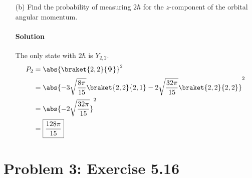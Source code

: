 \documentclass{article}
\begin{document}
\begin{enumerate}
		\item[(b)] Find the probability of measuring $2\hbar$ for the $z$-component of the orbital angular momentum. 
		\paragraph{Solution} The only state with $2\hbar$ is $Y_{2,2}$.
		\begin{equation}
			\begin{aligned}[b]
				P_2 &= \abs{ \braket{2,2}{\Psi} }^2 \\
					&= \abs{ -3 \sqrt{\frac{8\pi}{15}} \braket{2,2}{2,1} - 2 \sqrt{\frac{32\pi}{15}} \braket{2,2}{2,2} }^2 \\
					&= \abs{-2 \sqrt{\frac{32\pi}{15}}}^2 \\
					&= \boxed{\frac{128\pi}{15}}
			\end{aligned}
		\end{equation}
	\end{enumerate}
	
\clearpage
	
	\section*{Problem 3: Exercise 5.16}
	
\end{document}
